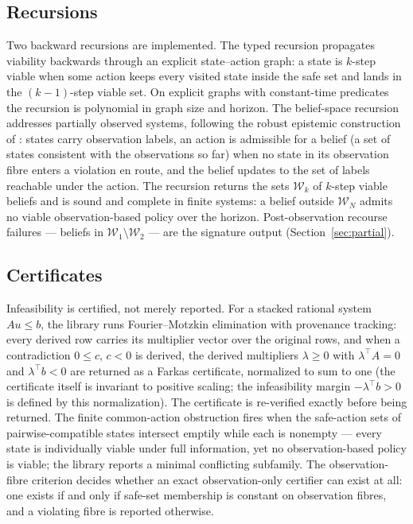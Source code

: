 \documentclass[3p,11pt]{elsarticle}
\begin{document}
\subsection{Recursions}\label{sec:recursions}

Two backward recursions are implemented. The typed recursion propagates
viability backwards through an explicit state--action graph: a state is
$k$-step viable when some action keeps every visited state inside the safe
set and lands in the $(k-1)$-step viable set. On explicit graphs with
constant-time predicates the recursion is polynomial in graph size and
horizon. The belief-space recursion addresses partially observed systems,
following the robust epistemic construction of \citet{Abaee2026b}: states carry
observation labels, an action is admissible for a belief (a set of states
consistent with the observations so far) when no state in its observation
fibre enters a violation en route, and the belief updates to the set of
labels reachable under the action. The recursion returns the sets
$\mathcal{W}_k$ of $k$-step viable beliefs and is sound and complete in
finite systems: a belief outside $\mathcal{W}_N$ admits no viable
observation-based policy over the horizon. Post-observation recourse
failures --- beliefs in $\mathcal{W}_1 \setminus \mathcal{W}_2$ --- are the
signature output (Section~\ref{sec:partial}).

\subsection{Certificates}\label{sec:certificates}

Infeasibility is certified, not merely reported. For a stacked rational
system $A u \leq b$, the library runs Fourier--Motzkin elimination with
provenance tracking: every derived row carries its multiplier vector over
the original rows, and when a contradiction $0 \leq c$, $c < 0$ is derived,
the derived multipliers $\lambda \geq 0$ with $\lambda^{\top} A = 0$ and
$\lambda^{\top} b < 0$ are returned as a Farkas certificate, normalized to
sum to one (the certificate itself is invariant to positive scaling; the
infeasibility margin $-\lambda^{\top} b > 0$ is defined by this
normalization). The certificate is
re-verified exactly before being returned. The finite common-action
obstruction fires when the safe-action sets of pairwise-compatible states
intersect emptily while each is nonempty --- every state is individually
viable under full information, yet no observation-based policy is viable;
the library reports a minimal conflicting subfamily. The observation-fibre
criterion decides whether an exact observation-only certifier can exist at
all: one exists if and only if safe-set membership is constant on
observation fibres, and a violating fibre is reported otherwise.
\end{document}
